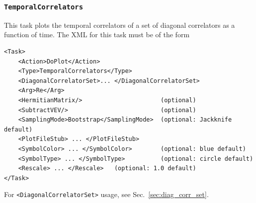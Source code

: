 \documentclass[12pt]{article}
\newcommand{\vb}{\texttt}
\begin{document}
\subsubsection{\vb{TemporalCorrelators}}
This task plots the temporal correlators of a set of diagonal correlators
as a function of time. The XML for this task must be of the form
\begin{verbatim}
<Task>
    <Action>DoPlot</Action>
    <Type>TemporalCorrelators</Type>
    <DiagonalCorrelatorSet>... </DiagonalCorrelatorSet>
    <Arg>Re</Arg>
    <HermitianMatrix/>                      (optional)
    <SubtractVEV/>                          (optional)
    <SamplingMode>Bootstrap</SamplingMode>  (optional: Jackknife default)
    <PlotFileStub> ... </PlotFileStub>
    <SymbolColor> ... </SymbolColor>        (optional: blue default)
    <SymbolType> ... </SymbolType>          (optional: circle default)
    <Rescale> ... </Rescale>   (optional: 1.0 default)
</Task>
\end{verbatim}
For \vb{<DiagonalCorrelatorSet>} usage, see Sec.~\ref{sec:diag_corr_set}.
%
\end{document}
